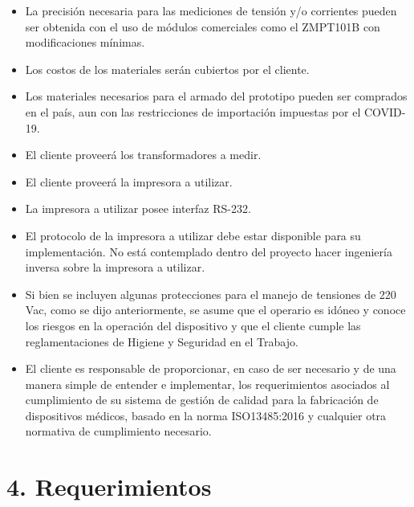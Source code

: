 \documentclass[11pt]{charter}
\begin{document}
\begin{itemize}
\item La precisión necesaria para las mediciones de tensión y/o corrientes pueden ser obtenida con el uso de módulos comerciales como el ZMPT101B con modificaciones mínimas.
\item Los costos de los materiales serán cubiertos por el cliente.
\item Los materiales necesarios para el armado del prototipo pueden ser comprados en el país, aun con las restricciones de importación impuestas por el COVID-19.
\item El cliente proveerá los transformadores a medir.
\item El cliente proveerá la impresora a utilizar.
\item La impresora a utilizar posee interfaz RS-232.
\item El protocolo de la impresora a utilizar debe estar disponible para su implementación. No está contemplado dentro del proyecto hacer ingeniería inversa sobre la impresora a utilizar.
\item Si bien se incluyen algunas protecciones para el manejo de tensiones de 220 Vac, como se dijo anteriormente, se asume que el operario es idóneo y conoce los riesgos en la operación del dispositivo y que el cliente cumple las reglamentaciones de Higiene y Seguridad en el Trabajo.
\item El cliente es responsable de proporcionar, en caso de ser necesario y de una manera simple de entender e implementar, los requerimientos asociados al cumplimiento de su sistema de gestión de calidad para la fabricación de dispositivos médicos, basado en la norma ISO13485:2016 y cualquier otra normativa de cumplimiento necesario.
\end{itemize}



\section{4. Requerimientos}
\label{sec:requerimientos}
\end{document}
